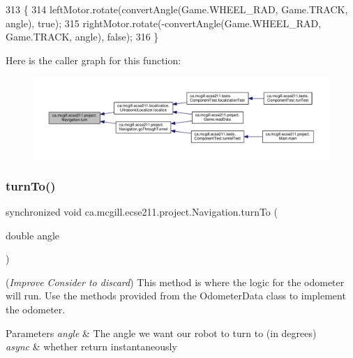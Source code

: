 \begin{DoxyCode}
313                               \{
314     leftMotor.rotate(convertAngle(Game.WHEEL\_RAD, Game.TRACK, angle), \textcolor{keyword}{true});
315     rightMotor.rotate(-convertAngle(Game.WHEEL\_RAD, Game.TRACK, angle), \textcolor{keyword}{false});
316   \}
\end{DoxyCode}
Here is the caller graph for this function\+:
\nopagebreak
\begin{figure}[H]
\begin{center}
\leavevmode
\includegraphics[width=350pt]{classca_1_1mcgill_1_1ecse211_1_1project_1_1_navigation_ad74286ad36d333bfaf57661837457b76_icgraph}
\end{center}
\end{figure}
\mbox{\label{classca_1_1mcgill_1_1ecse211_1_1project_1_1_navigation_a3bbe0645f2b3b3d0986b4a707fb5a00c}} 
\subsubsection{\texorpdfstring{turn\+To()}{turnTo()}}
{\footnotesize\ttfamily synchronized void ca.\+mcgill.\+ecse211.\+project.\+Navigation.\+turn\+To (\begin{DoxyParamCaption}\item[{double}]{angle }\end{DoxyParamCaption})}

({\itshape Improve} {\itshape Consider to discard}) This method is where the logic for the odometer will run. Use the methods provided from the Odometer\+Data class to implement the odometer.


\begin{DoxyParams}{Parameters}
{\em angle} & The angle we want our robot to turn to (in degrees) \\
\hline
{\em async} & whether return instantaneously \\
\hline
\end{DoxyParams}


